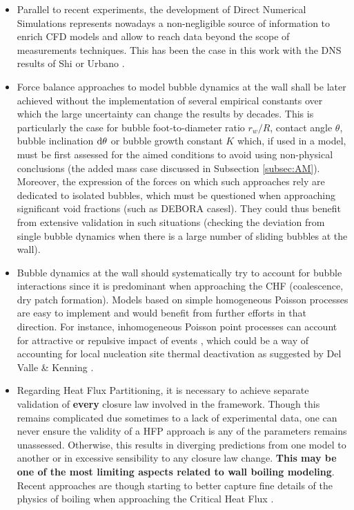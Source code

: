 \begin{itemize}

\item Parallel to recent experiments, the development of Direct Numerical Simulations represents nowadays a non-negligible source of information to enrich CFD models and allow to reach data beyond the scope of measurements techniques. This has been the case in this work with the DNS results of Shi \etal \cite{shi_drag_2021} or Urbano \etal \cite{urbano_direct_2018}.

\item Force balance approaches to model bubble dynamics at the wall shall be later achieved without the implementation of several empirical constants over which the large uncertainty can change the results by decades. This is particularly the case for bubble foot-to-diameter ratio $r_{w}/R$, contact angle $\theta$, bubble inclination $\mathrm{d}\theta$ or bubble growth constant $K$ which, if used in a model, must be first assessed for the aimed conditions to avoid using non-physical conclusions (\eg the added mass case discussed in Subsection \ref{subsec:AM}). Moreover, the expression of the forces on which such approaches rely are dedicated to isolated bubbles, which must be questioned when approaching significant void fractions (such as DEBORA casesl). They could thus benefit from extensive validation in such situations (\eg checking the deviation from single bubble dynamics when there is a large number of sliding bubbles at the wall).


\item Bubble dynamics at the wall should systematically try to account for bubble interactions since it is predominant when approaching the CHF (\eg coalescence, dry patch formation). Models based on simple homogeneous Poisson processes are easy to implement and would benefit from further efforts in that direction. For instance, inhomogeneous Poisson point processes can account for attractive or repulsive impact of events \cite{daley_introduction_2003}, which could be a way of accounting for local nucleation site thermal deactivation as suggested by Del Valle \& Kenning \cite{del_valle_subcooled_1985}.

\item Regarding Heat Flux Partitioning, it is necessary to achieve separate validation of \textbf{every} closure law involved in the framework. Though this remains complicated due sometimes to a lack of experimental data, one can never ensure the validity of a HFP approach is any of the parameters remains unassessed. Otherwise, this results in diverging predictions from one model to another or in excessive sensibility to any closure law change. \textbf{This may be one of the most limiting aspects related to wall boiling modeling}. Recent approaches are though starting to better capture fine details of the physics of boiling when approaching the Critical Heat Flux \cite{baglietto_boiling_2019}.


\end{itemize}
